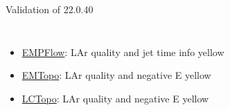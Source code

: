 \begin{frame}{Validation of 22.0.40}
\begin{columns}
\begin{column}{0.5\textwidth}
\begin{figure}
            \end{figure}
        \end{column}
    \end{columns}
        \begin{itemize}
        \item \href{https://atlas-computing.web.cern.ch/atlas-computing/links/PhysValDir/JetEtMiss/jet_03-08-21_ckirfel_22040/AntiKt4EMPFlowJets/index.html}{EMPFlow}: LAr quality and jet time info yellow
        \item \href{https://atlas-computing.web.cern.ch/atlas-computing/links/PhysValDir/JetEtMiss/jet_03-08-21_ckirfel_22040/AntiKt4EMTopoJets/index.html}{EMTopo}: LAr quality and negative E yellow
        \item \href{https://atlas-computing.web.cern.ch/atlas-computing/links/PhysValDir/JetEtMiss/jet_03-08-21_ckirfel_22040/AntiKt4LCTopoJets/index.html}{LCTopo}: LAr quality and negative E yellow
    \end{itemize}
\end{frame}